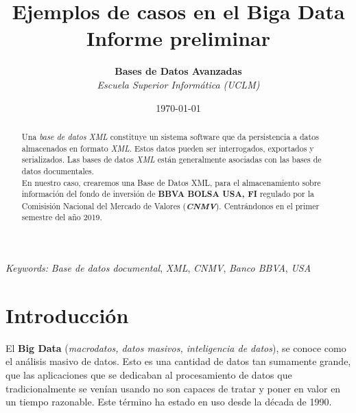 \documentclass[11pt]{diazessay} %
\title{\textbf{Ejemplos de casos en el Biga Data \\ Informe preliminar}} %
\author{\textbf{Bases de Datos Avanzadas} \\ \textit{Escuela Superior Informática (UCLM)}} %
\date{\today} %
\begin{document}
\maketitle %




\begin{abstract}
	
	Una \textit{base de datos XML} constituye un sistema software que da persistencia a datos almacenados en formato \textit{XML}. Estos datos pueden ser interrogados, exportados y serializados. Las bases de datos \textit{XML} están generalmente asociadas con las bases de datos documentales.\\
	
	En nuestro caso, crearemos una Base de Datos XML, para el almacenamiento sobre información del fondo de inversión de \textbf{BBVA BOLSA USA, FI} regulado por la Comisisión Nacional del Mercado de Valores (\textbf{\textit{CNMV}}). Centrándonos en el primer semestre del año 2019.
\end{abstract}

\hspace*{3.6mm}\textit{Keywords:} \textit{Base de datos documental}, \textit{XML}, \textit{CNMV}, \textit{Banco BBVA}, \textit{USA}

\vspace{20pt} %

\newpage
\section*{Introducción}

El \textbf{Big Data} (\textit{macrodatos, datos masivos, inteligencia de datos}), se conoce como el análisis masivo de datos. Esto es una cantidad de datos tan sumamente grande, que las aplicaciones que se dedicaban al  procesamiento de datos que tradicionalmente se venían usando no son capaces de tratar y poner en valor en un tiempo razonable. Este  término ha estado en uso desde la década de 1990.\\
\end{document}

